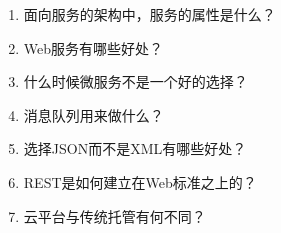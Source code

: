 \begin{enumerate}
\item
面向服务的架构中，服务的属性是什么？

\item
Web服务有哪些好处？

\item
什么时候微服务不是一个好的选择？

\item
消息队列用来做什么？

\item
选择JSON而不是XML有哪些好处？

\item
REST是如何建立在Web标准之上的？

\item
云平台与传统托管有何不同？
\end{enumerate}